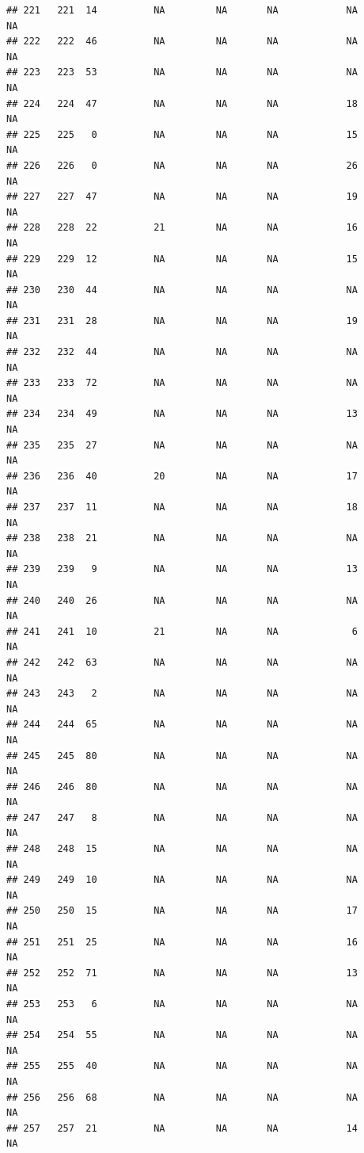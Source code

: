 \documentclass[man]{apa6}
\begin{document}
\begin{verbatim}
## 221   221  14          NA         NA       NA            NA       NA
## 222   222  46          NA         NA       NA            NA       NA
## 223   223  53          NA         NA       NA            NA       NA
## 224   224  47          NA         NA       NA            18       NA
## 225   225   0          NA         NA       NA            15       NA
## 226   226   0          NA         NA       NA            26       NA
## 227   227  47          NA         NA       NA            19       NA
## 228   228  22          21         NA       NA            16       NA
## 229   229  12          NA         NA       NA            15       NA
## 230   230  44          NA         NA       NA            NA       NA
## 231   231  28          NA         NA       NA            19       NA
## 232   232  44          NA         NA       NA            NA       NA
## 233   233  72          NA         NA       NA            NA       NA
## 234   234  49          NA         NA       NA            13       NA
## 235   235  27          NA         NA       NA            NA       NA
## 236   236  40          20         NA       NA            17       NA
## 237   237  11          NA         NA       NA            18       NA
## 238   238  21          NA         NA       NA            NA       NA
## 239   239   9          NA         NA       NA            13       NA
## 240   240  26          NA         NA       NA            NA       NA
## 241   241  10          21         NA       NA             6       NA
## 242   242  63          NA         NA       NA            NA       NA
## 243   243   2          NA         NA       NA            NA       NA
## 244   244  65          NA         NA       NA            NA       NA
## 245   245  80          NA         NA       NA            NA       NA
## 246   246  80          NA         NA       NA            NA       NA
## 247   247   8          NA         NA       NA            NA       NA
## 248   248  15          NA         NA       NA            NA       NA
## 249   249  10          NA         NA       NA            NA       NA
## 250   250  15          NA         NA       NA            17       NA
## 251   251  25          NA         NA       NA            16       NA
## 252   252  71          NA         NA       NA            13       NA
## 253   253   6          NA         NA       NA            NA       NA
## 254   254  55          NA         NA       NA            NA       NA
## 255   255  40          NA         NA       NA            NA       NA
## 256   256  68          NA         NA       NA            NA       NA
## 257   257  21          NA         NA       NA            14       NA

\end{verbatim}
\end{document}
